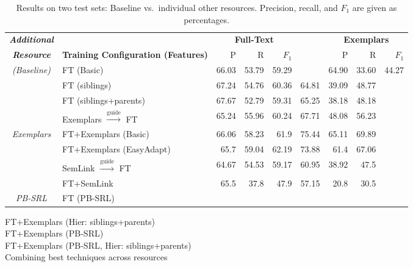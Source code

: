 \begin{table*}\centering\small
\begin{tabular}{>{\itshape}clrrr@{~~}r@{~~}rrr}
\toprule
\normalfont\textbf{Additional} & & \multicolumn{3}{c}{\textbf{Full-Text}} && \multicolumn{3}{c}{\textbf{Exemplars}} \\
\cline{3-5}\cline{7-9}
\normalfont\textbf{Resource} & \textbf{Training Configuration (Features)} & P\hphantom{11} & R\hphantom{11} & $F_1$\hphantom{0} && P\hphantom{11} & R\hphantom{11} & $F_1$\hphantom{0} \\
\midrule
(Baseline) & FT (Basic) & 66.03 & 53.79 & 59.29 && 64.90 & 33.60 & 44.27 \\
\midrule
\multirow{2}{*}{FN Hierarchy} & FT (siblings) & 67.24 & 54.76 & 60.36 & 64.81 & 39.09 & 48.77 \\
          & FT (siblings+parents) & 67.67 & 52.79 & 59.31 & 65.25 & 38.18 & 48.18 \\
\midrule
& Exemplars $\xrightarrow{\text{guide}}$ FT & 65.24 & 55.96 & 60.24 & 67.71 & 48.08 & 56.23\\
Exemplars & FT+Exemplars (Basic) & 66.06 & 58.23 & 61.9 & 75.44 & 65.11 & 69.89 \\
& FT+Exemplars (EasyAdapt) & 65.7 & 59.04 & 62.19 & 73.88 & 61.4 & 67.06 \\
\midrule
\multirow{2}{*}{SemLink} & SemLink $\xrightarrow{\text{guide}}$ FT & 64.67 & 54.53 & 59.17 & 60.95 & 38.92 & 47.5 \\
& FT+SemLink & 65.5 & 37.8 & 47.9 & 57.15 & 20.8 & 30.5 \\
\midrule
PB-SRL & FT (PB-SRL) \\
\bottomrule
\end{tabular}
\caption{Results on two test sets: Baseline vs.~individual other resources. 
Precision, recall, and $F_1$ are given as percentages.}
\label{tbl:results}
\end{table*}

\begin{table*}\centering\small
FT+Exemplars (Hier: siblings+parents) \\
FT+Exemplars (PB-SRL) \\
FT+Exemplars (PB-SRL, Hier: siblings+parents) \\
\caption{Combining best techniques across resources }
\end{table*}
